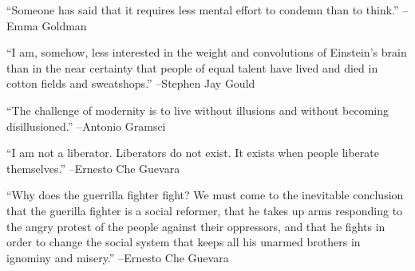 \documentclass{article}%
\begin{document}
\linebreak%
\vspace{1mm}%
\begin{minipage}{\textwidth}%
\flushleft%
“Someone has said that it requires less mental effort to condemn than to think.”%
\linebreak%
\vspace{1mm}%
–Emma Goldman%
\linebreak%
\vspace{1mm}%
\end{minipage}%
\linebreak%
\vspace{1mm}%
\begin{minipage}{\textwidth}%
\flushleft%
“I am, somehow, less interested in the weight and convolutions of Einstein's brain than in the near certainty that people of equal talent have lived and died in cotton fields and sweatshops.”%
\linebreak%
\vspace{1mm}%
–Stephen Jay Gould%
\linebreak%
\vspace{1mm}%
\end{minipage}%
\linebreak%
\vspace{1mm}%
\begin{minipage}{\textwidth}%
\flushleft%
“The challenge of modernity is to live without illusions and without becoming disillusioned.”%
\linebreak%
\vspace{1mm}%
–Antonio Gramsci%
\linebreak%
\vspace{1mm}%
\end{minipage}%
\linebreak%
\vspace{1mm}%
\begin{minipage}{\textwidth}%
\flushleft%
“I am not a liberator. Liberators do not exist. It exists when people liberate themselves.”%
\linebreak%
\vspace{1mm}%
–Ernesto Che Guevara%
\linebreak%
\vspace{1mm}%
\end{minipage}%
\linebreak%
\vspace{1mm}%
\begin{minipage}{\textwidth}%
\flushleft%
“Why does the guerrilla fighter fight? We must come to the inevitable conclusion that the guerilla fighter is a social reformer, that he takes up arms responding to the angry protest of the people against their oppressors, and that he fights in order to change the social system that keeps all his unarmed brothers in ignominy and misery.”%
\linebreak%
\vspace{1mm}%
–Ernesto Che Guevara%
\linebreak%
\vspace{1mm}%
\end{minipage}%
\end{document}
